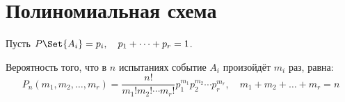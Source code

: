 \section{Полиномиальная схема}

\begin{definition}
	Пусть $ P\Set{A_i} = p_i, \quad p_1 + \dots + p_r = 1 $.

	Вероятность того, что в $ n $ испытаниях событие $ A_i $ произойдёт $ m_i $ раз, равна:
	$$ P_n(m_1, m_2, \dots, m_r) =
	\frac{n!}{m_1! m_2! \cdots m_r!} p_1^{m_1} p_2^{m_2} \cdots p_r^{m_r}, \quad
	m_1 + m_2 + \dots + m_r = n $$
\end{definition}
